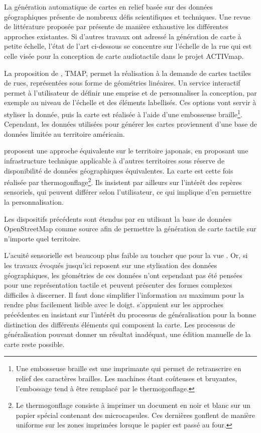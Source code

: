 \newpar{}

La génération automatique de cartes en relief basée sur des données géographiques présente de nombreux défis scientifiques et techniques. Une revue de littérature proposée par \citet{Wabinski2019} présente de manière exhaustive les différentes approches existantes. Si d'autres travaux ont adressé la génération de carte à petite échelle, l'état de l'art ci-dessous se concentre sur l'échelle de la rue qui est celle visée pour la conception de carte audiotactile dans le projet ACTIVmap.

\newpar{}

La proposition de \citet{Miele2004}, TMAP, permet la réalisation à la demande de cartes tactiles de rues, représentées sous forme de géométries linéaires. Un service interactif permet à l'utilisateur de définir une emprise et de personnaliser la conception, par exemple au niveau de l'échelle et des éléments labellisés. Ces options vont servir à styliser la donnée, puis la carte est réalisée à l'aide d'une embosseuse braille\footnote{Une embosseuse braille est une imprimante qui permet de retranscrire en relief des caractères brailles. Les machines étant coûteuses et bruyantes, l'embossage tend à être remplacé par le thermogonflage.}. Cependant, les données utilisées pour générer les cartes proviennent d'une base de données limitée au territoire américain. 

\newpar{}

\citet{Minatani2010} proposent une approche équivalente sur le territoire japonais, en proposant une infrastructure technique applicable à d'autres territoires sous réserve de disponibilité de données géographiques équivalentes. La carte est cette fois réalisée par thermogonflage\footnote{Le thermogonflage consiste à imprimer un document en noir et blanc sur un papier spécial contenant des microcapsules. Ces dernières gonflent de manière uniforme sur les zones imprimées lorsque le papier est passé au four.}. Ils insistent par ailleurs sur l'intérêt des repères sensoriels, qui peuvent différer selon l'utilisateur, ce qui implique d'en permettre la personnalisation. 

\newpar{}

Les dispositifs précédents sont étendus par \citet{Watanabe2014, Cervenka2016} en utilisant la base de données OpenStreetMap comme source afin de permettre la génération de carte tactile sur n'importe quel territoire.

\newpar{}

L'acuité sensorielle est beaucoup plus faible au toucher que pour la vue \missref{}. Or, si les travaux évoqués jusqu'ici reposent sur une stylisation des données géographiques, les géométries de ces données n'ont cependant pas été pensées pour une représentation tactile et peuvent présenter des formes complexes difficiles à discerner. Il faut donc simplifier l'information  au maximum pour la rendre plus facilement lisible avec le doigt. \citet{Stampach2016} s'appuient sur les approches précédentes en insistant sur l’intérêt du processus de généralisation pour la bonne distinction des différents éléments qui composent la carte. Les processus de généralisation pouvant donner un résultat inadéquat, une édition manuelle de la carte reste possible.

